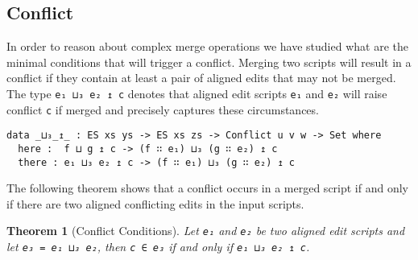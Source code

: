 \documentclass[preprint]{sigplanconf}
\theoremstyle{plain}
\newtheorem{thm}{Theorem}
\begin{document}
    \subsection{Conflict}  
    In order to reason about complex merge operations we have studied
    what are the minimal conditions that will trigger a conflict.
    Merging two scripts will result in a conflict if they contain at
    least a pair of aligned edits that may not be merged.  
    The type \texttt{e₁ ⊔₃ e₂ ↥ c} denotes that aligned edit scripts
    \texttt{e₁} and \texttt{e₂} will raise conflict \texttt{c} if
    merged and precisely captures these circumstances.

\begin{verbatim}
data _⊔₃_↥_ : ES xs ys -> ES xs zs -> Conflict u v w -> Set where
  here :  f ⊔ g ↥ c -> (f ∷ e₁) ⊔₃ (g ∷ e₂) ↥ c
  there : e₁ ⊔₃ e₂ ↥ c -> (f ∷ e₁) ⊔₃ (g ∷ e₂) ↥ c
\end{verbatim}



    The following theorem shows that a conflict occurs in a merged script
    if and only if there are two aligned conflicting edits in the input scripts.
    
\begin{thm}[Conflict Conditions]
  Let \texttt{e₁} and \texttt{e₂} be two aligned edit scripts
  and let \texttt{e₃ = e₁ ⊔₃ e₂}, then \texttt{c ∈ e₃} if and only if
  \texttt{e₁ ⊔₃ e₂ ↥ c}.
\end{thm}



\end{document}
